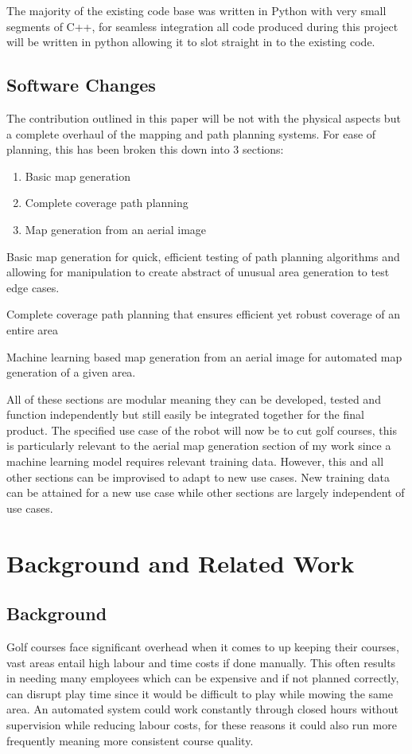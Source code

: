 \documentclass[final]{cmpreport_02}
\begin{document}
The majority of the existing code base was written in Python with very small segments of C++, for seamless integration all code produced during this project will be written in python allowing it to slot straight in to the existing code.

\subsection{Software Changes}
The contribution outlined in this paper will be not with the physical aspects but a complete overhaul of the mapping and path planning systems.
For ease of planning, this has been broken this down into 3 sections:
\begin{enumerate}
	\item Basic map generation
	\item Complete coverage path planning
	\item Map generation from an aerial image
\end{enumerate}

Basic map generation for quick, efficient testing of path planning algorithms and allowing for manipulation to create abstract of unusual area generation to test edge cases.

Complete coverage path planning that ensures efficient yet robust coverage of an entire area

Machine learning based map generation from an aerial image for automated map generation of a given area.

All of these sections are modular meaning they can be developed, tested and function independently but still easily be integrated together for the final product.
The specified use case of the robot will now be to cut golf courses, this is particularly relevant to the aerial map generation section of my work since a machine learning model requires relevant training data.
However, this and all other sections can be improvised to adapt to new use cases.
New training data can be attained for a new use case while other sections are largely independent of use cases.


\section{Background and Related Work}
\subsection{Background}
Golf courses face significant overhead when it comes to up keeping their courses, vast areas entail high labour and time costs if done manually. 
This often results in needing many employees which can be expensive and if not planned correctly, can disrupt play time since it would be difficult to play while mowing the same area.
An automated system could work constantly through closed hours without supervision while reducing labour costs, for these reasons it could also run more frequently meaning more consistent course quality.
\end{document}
